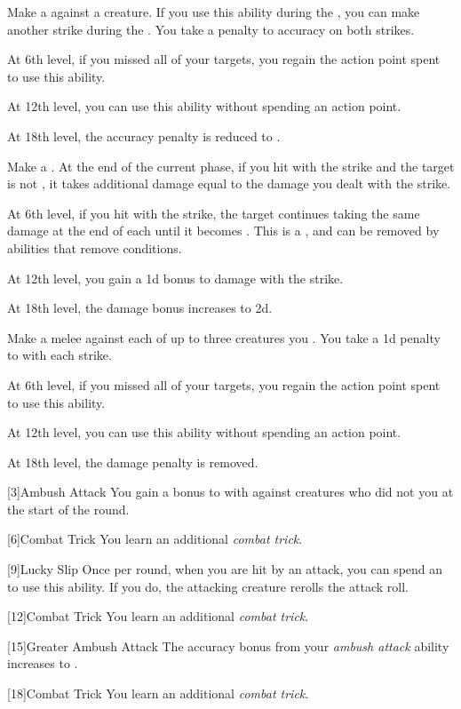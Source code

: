 {             Make a  against a creature.
            If you use this ability during the , you can make another strike during the .
            You take a  penalty to accuracy on both strikes.
            \par At 6th level, if you missed all of your targets, you regain the action point spent to use this ability.
            \par At 12th level, you can use this ability without spending an action point.
            \par At 18th level, the accuracy penalty is reduced to .

             Make a .
            At the end of the current phase, if you hit with the strike and the target is not , it takes additional damage equal to the damage you dealt with the strike.
            \par At 6th level, if you hit with the strike, the target continues taking the same damage at the end of each  until it becomes .
            This is a , and can be removed by abilities that remove conditions.
            \par At 12th level, you gain a \plus1d bonus to damage with the strike.
            \par At 18th level, the damage bonus increases to \plus2d.

             Make a melee  against each of up to three creatures you .
            You take a \minus1d penalty to  with each strike.
            \par At 6th level, if you missed all of your targets, you regain the action point spent to use this ability.
            \par At 12th level, you can use this ability without spending an action point.
            \par At 18th level, the damage penalty is removed.

        }

        [3]{Ambush Attack}
        You gain a  bonus to  with  against creatures who did not  you at the start of the round.

        [6]{Combat Trick}
        You learn an additional \textit{combat trick}.

        [9]{Lucky Slip}
        Once per round, when you are hit by an attack, you can spend an  to use this ability.
        If you do, the attacking creature rerolls the attack roll.

        [12]{Combat Trick}
        You learn an additional \textit{combat trick}.

        [15]{Greater Ambush Attack}
        The accuracy bonus from your \textit{ambush attack} ability increases to .

        [18]{Combat Trick}
        You learn an additional \textit{combat trick}.
